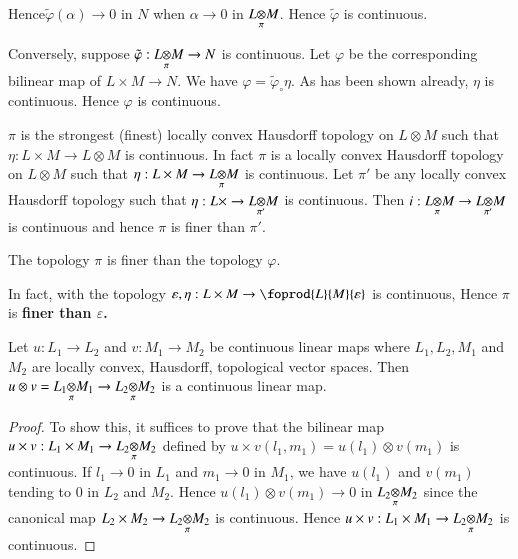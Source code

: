 Hence\pageoriginale $\tilde{\varphi}(\alpha) \to 0$ in $N$ when
$\alpha \to 0$ in $\fibreoproduct{L}{M}{\pi}$. Hence
$\tilde{\varphi}$ is continuous.

Conversely, suppose $\tilde{\varphi}:\fibreoproduct{L}{M}{\pi} \to
N$ is continuous. Let $\varphi$ be the corresponding bilinear map of
$L \times M \to N$. We have $\varphi = \tilde{\varphi}_\circ \eta$. As
has been shown already, $\eta$ is continuous. Hence $\varphi$ is
continuous. 

\begin{cor}
$\pi$ is the strongest (finest) locally convex Hausdorff topology on
$L \otimes M$ such that $\eta : L \times M \to L \otimes M$ is
continuous. In fact $\pi$ is a locally convex Hausdorff topology on
$L \otimes M$ such that $\eta : L \times M \to\fibreoproduct{L}{M}{\pi}$
is continuous. Let $\pi'$ be any locally convex Hausdorff topology
such that $\eta : L \times \to\fibreoproduct{L}{M}{\pi'}$ is
continuous. Then $i :\fibreoproduct{L}{M}{\pi}\to
\fibreoproduct{L}{M}{\pi'}$ is continuous and hence $\pi$ is finer
than $\pi'$.  
\end{cor}

\begin{cor}
The topology $\pi$ is finer than the
topology $\varphi$. 
\end{cor}

In fact, with the topology $\varepsilon, \eta : L \times M \to
\foprod{L}{M}{\varepsilon}$ is continuous, Hence $\pi$ is 
{\bf finer than $\varepsilon$.}

\setcounter{prop}{0}
\begin{prop}\label{chap12:prop12.1}
Let $u : L_1 \to L_2$ and $v : M_1 \to M_2$ be continuous linear maps
where $L_1, L_2, M_1$ and $M_2$ are locally convex, Hausdorff,
topological vector spaces. Then $u \otimes v =\fibreoproduct{L_1}
{M_1}{\pi} \to\fibreoproduct{L_2}{M_2}{\pi}$ is a
continuous linear map.
\end{prop}

\begin{proof}
To show this, it suffices to prove that the bilinear map $u \times v :
L_1 \times M_1 \to\fibreoproduct{L_2}{M_2}{\pi}$ defined by $u
\times v (l_1, m_1) = u(l_1)\otimes v(m_1)$ is continuous. If $l_1 \to
0$ in $L_1$ and $m_1 \to 0$ in $M_1$, we have $u(l_1)$ and $v(m_1)$
tending to $0$ in $L_2$ and $M_2$. Hence $u(l_1)\otimes v(m_1) \to 0$
in $\fibreoproduct{L_2}{M_2}{\pi}$ since the canonical map $L_2
\times M_2 \to \fibreoproduct{L_2}{M_2}{\pi}$ is continuous. Hence $u
\times v : L_1 \times M_1 \to\fibreoproduct{L_2}{M_2}{\pi}$ is continuous.
\end{proof}

